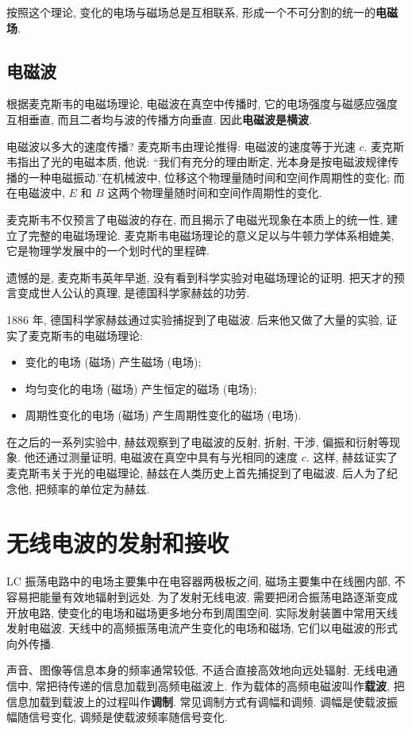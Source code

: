 \documentclass[UTF8,openany,fontset=fandol]{ctexbook}
\theoremstyle{chinesetextbook}
\begin{document}
按照这个理论, 变化的电场与磁场总是互相联系, 形成一个不可分割的统一的\textbf{电磁场}.
\subsection{电磁波}
根据麦克斯韦的电磁场理论, 电磁波在真空中传播时, 它的电场强度与磁感应强度互相垂直, 而且二者均与波的传播方向垂直. 因此\textbf{电磁波是横波}.

电磁波以多大的速度传播? 麦克斯韦由理论推得: 电磁波的速度等于光速 $c$. 麦克斯韦指出了光的电磁本质, 他说: “我们有充分的理由断定, 光本身是按电磁波规律传播的一种电磁振动.”在机械波中, 位移这个物理量随时间和空间作周期性的变化; 而在电磁波中, $E$ 和 $B$ 这两个物理量随时间和空间作周期性的变化.

麦克斯韦不仅预言了电磁波的存在, 而且揭示了电磁光现象在本质上的统一性, 建立了完整的电磁场理论. 麦克斯韦电磁场理论的意义足以与牛顿力学体系相媲美, 它是物理学发展中的一个划时代的里程碑.

遗憾的是, 麦克斯韦英年早逝, 没有看到科学实验对电磁场理论的证明. 把天才的预言变成世人公认的真理, 是德国科学家赫兹的功劳.

1886 年, 德国科学家赫兹通过实验捕捉到了电磁波. 后来他又做了大量的实验, 证实了麦克斯韦的电磁场理论:
\begin{itemize}
\item 变化的电场 (磁场) 产生磁场 (电场);
\item 均匀变化的电场 (磁场) 产生恒定的磁场 (电场);
\item 周期性变化的电场 (磁场) 产生周期性变化的磁场 (电场).
\end{itemize}

在之后的一系列实验中, 赫兹观察到了电磁波的反射, 折射, 干涉, 偏振和衍射等现象. 他还通过测量证明, 电磁波在真空中具有与光相同的速度 $c$. 这样, 赫兹证实了麦克斯韦关于光的电磁理论, 赫兹在人类历史上首先捕捉到了电磁波. 后人为了纪念他, 把频率的单位定为赫兹.
\section{无线电波的发射和接收}
LC 振荡电路中的电场主要集中在电容器两极板之间, 磁场主要集中在线圈内部, 不容易把能量有效地辐射到远处. 为了发射无线电波, 需要把闭合振荡电路逐渐变成开放电路, 使变化的电场和磁场更多地分布到周围空间. 实际发射装置中常用天线发射电磁波. 天线中的高频振荡电流产生变化的电场和磁场, 它们以电磁波的形式向外传播.

声音、图像等信息本身的频率通常较低, 不适合直接高效地向远处辐射. 无线电通信中, 常把待传递的信息加载到高频电磁波上. 作为载体的高频电磁波叫作\textbf{载波}, 把信息加载到载波上的过程叫作\textbf{调制}. 常见调制方式有调幅和调频. 调幅是使载波振幅随信号变化, 调频是使载波频率随信号变化.
\end{document}
